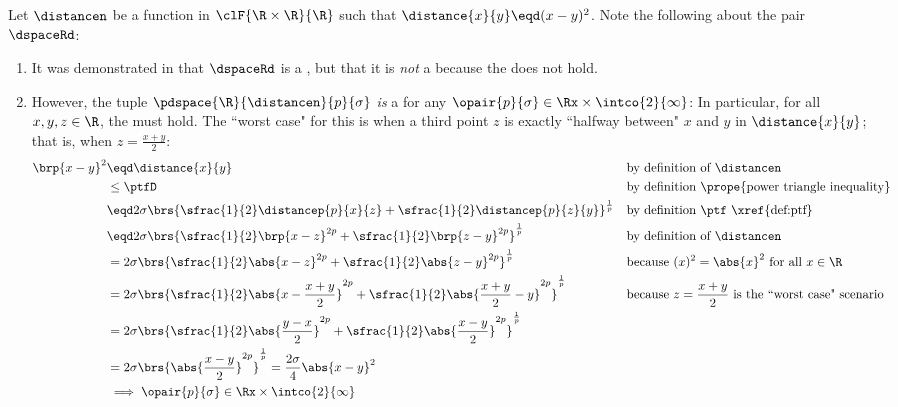 \begin{example}
\label{ex:pdspace_xy2}
Let $\distancen$ be a function in $\clF{\R\times\R}{\R}$ such that $\distance{x}{y}\eqd(x-y)^2$.
Note the following about the pair $\dspaceRd$:
\begin{enumerate}
  \item It was demonstrated in  that $\dspaceRd$ is a ,
        but that it is \emph{not} a  because the  does not hold.

  \item However, the tuple $\pdspace{\R}{\distancen}{p}{\sigma}$ \emph{is} a
          for any $\opair{p}{\sigma}\in\Rx\times\intco{2}{\infty}$:
        In particular, for all $x,y,z\in\R$, the   must hold.
        The ``worst case" for this is when a third point $z$ is exactly ``halfway between" $x$ and $y$ in $\distance{x}{y}$;
        that is, when $z=\frac{x+y}{2}$:
        \begin{align*}
          \brp{x-y}^2
            &\eqd \distance{x}{y}
            && \text{by definition of $\distancen$}
          \\&\le  \ptfD
            && \text{by definition \prope{power triangle inequality}}
          \\&\eqd 2\sigma\brs{\sfrac{1}{2}\distancep{p}{x}{z}+\sfrac{1}{2}\distancep{p}{z}{y}}^\frac{1}{p}
            && \text{by definition $\ptf$ \xref{def:ptf}}
          \\&\eqd  2\sigma\brs{\sfrac{1}{2}\brp{x-z}^{2p}+\sfrac{1}{2}\brp{z-y}^{2p}}^\frac{1}{p}
            && \text{by definition of $\distancen$}
          \\&=     2\sigma\brs{\sfrac{1}{2}\abs{x-z}^{2p}+\sfrac{1}{2}\abs{z-y}^{2p}}^\frac{1}{p}
            && \text{because $(x)^2 = \abs{x}^2$ for all $x\in\R$}
          \\&=     2\sigma\brs{\sfrac{1}{2}\abs{x-\frac{x+y}{2}}^{2p}+\sfrac{1}{2}\abs{\frac{x+y}{2}-y}^{2p}}^\frac{1}{p}
            && \text{because $z=\frac{x+y}{2}$ is the ``worst case" scenario}
          \\&=     2\sigma\brs{\sfrac{1}{2}\abs{\frac{y-x}{2}}^{2p}+\sfrac{1}{2}\abs{\frac{x-y}{2}}^{2p}}^\frac{1}{p}
          \\&=     2\sigma\brs{\abs{\frac{x-y}{2}}^{2p}}^\frac{1}{p}
             =     \frac{2\sigma}{4}\abs{x-y}^{2}
          \\&\implies \opair{p}{\sigma}\in\Rx\times\intco{2}{\infty}
        \end{align*}


\end{enumerate}
\end{example}
